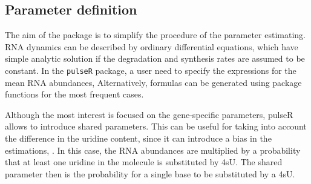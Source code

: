 \subsection{Parameter definition}
\par The aim of the package is to simplify the procedure of the parameter estimating.
RNA dynamics can be described by ordinary differential equations,
which have simple analytic solution 
if the degradation and synthesis rates are assumed to be constant.
In the \verb|pulseR| package,
a user need to specify the expressions for the mean RNA abundances,
Alternatively, formulas can be generated using package functions for the 
most frequent cases. 
\par 
Although the most interest is focused on the gene-specific parameters,
pulseR allows to introduce shared parameters.
 This can be useful for taking into account the difference in the uridine content, since
it can introduce a bias in the estimations, \citep{miller2011dynamic,
schwalb2012measurement}.
In this case, the RNA abundances are multiplied by 
a probability that at least one uridine in the molecule is substituted by 4sU.
The shared parameter then is the probability for a single base to be substituted
by a 4sU.
\par 
